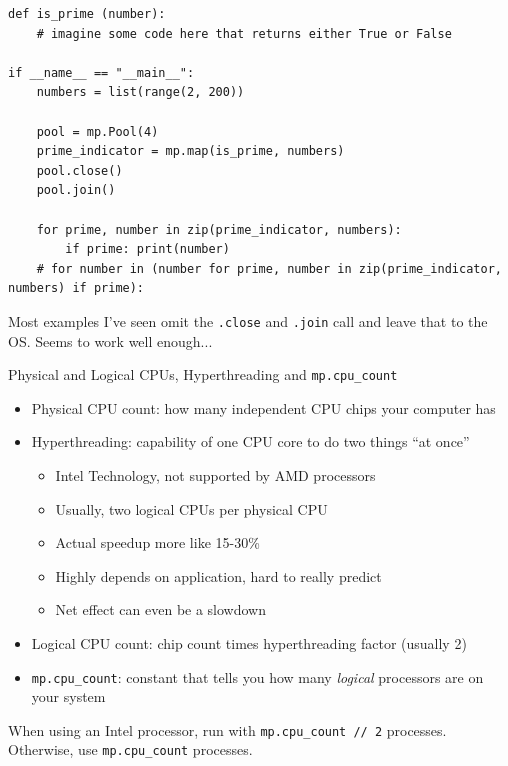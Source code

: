 \begin{frame}[fragile]
%
\begin{codebox}
\begin{verbatim}
def is_prime (number):
    # imagine some code here that returns either True or False

if __name__ == "__main__":
    numbers = list(range(2, 200))
    
    pool = mp.Pool(4)
    prime_indicator = mp.map(is_prime, numbers)
    pool.close()
    pool.join()
    
    for prime, number in zip(prime_indicator, numbers):
        if prime: print(number)
    # for number in (number for prime, number in zip(prime_indicator, numbers) if prime):
\end{verbatim}
\end{codebox}
%
\begin{hintbox}
\footnotesize
Most examples I've seen omit the \texttt{.close} and \texttt{.join} call and leave that to the OS. Seems to work well enough...
\end{hintbox}
%
\end{frame}


\begin{frame}{Physical and Logical CPUs, Hyperthreading and \texttt{mp.cpu\_count}}
%
\begin{itemize}
\item Physical CPU count: how many independent CPU chips your computer has
\item Hyperthreading: capability of one CPU core to do two things \enquote{at once} 
	\begin{itemize}
	\item Intel Technology, not supported by AMD processors
	\item Usually, two logical CPUs per physical CPU
	\item Actual speedup more like 15-30\%
	\item Highly depends on application, hard to really predict
	\item Net effect can even be a slowdown
	\end{itemize}
\item Logical CPU count: chip count times hyperthreading factor (usually 2)
\item \texttt{mp.cpu\_count}: constant that tells you how many \emph{logical} processors are on your system
\end{itemize}
%
\begin{hintbox}
When using an Intel processor, run with \texttt{mp.cpu\_count // 2} processes.\\
Otherwise, use \texttt{mp.cpu\_count} processes.
\end{hintbox}
%
\end{frame}

